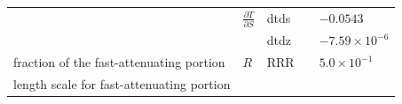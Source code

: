 \begin{longtable}[]{@{}lllll@{}}
\begin{minipage}[t]{0.31\columnwidth}
\end{minipage} & \begin{minipage}[t]{0.19\columnwidth}\raggedright
\(\frac{\partial T}{\partial S}\)\strut
\end{minipage} & \begin{minipage}[t]{0.08\columnwidth}\raggedright
dtds\strut
\end{minipage} & \begin{minipage}[t]{0.12\columnwidth}\raggedright
\strut
\end{minipage} & \begin{minipage}[t]{0.17\columnwidth}\raggedright
\(-0.0543\)\strut
\end{minipage}\tabularnewline
\begin{minipage}[t]{0.31\columnwidth}\raggedright
\strut
\end{minipage} & \begin{minipage}[t]{0.19\columnwidth}\raggedright
\strut
\end{minipage} & \begin{minipage}[t]{0.08\columnwidth}\raggedright
dtdz\strut
\end{minipage} & \begin{minipage}[t]{0.12\columnwidth}\raggedright
\strut
\end{minipage} & \begin{minipage}[t]{0.17\columnwidth}\raggedright
\(-7.59\times 10^{-6}\)\strut
\end{minipage}\tabularnewline
\begin{minipage}[t]{0.31\columnwidth}\raggedright
fraction of the fast-attenuating portion\strut
\end{minipage} & \begin{minipage}[t]{0.19\columnwidth}\raggedright
\(R\)\strut
\end{minipage} & \begin{minipage}[t]{0.08\columnwidth}\raggedright
RRR\strut
\end{minipage} & \begin{minipage}[t]{0.12\columnwidth}\raggedright
\strut
\end{minipage} & \begin{minipage}[t]{0.17\columnwidth}\raggedright
\(5.0\times 10^{-1}\)\strut
\end{minipage}\tabularnewline
\begin{minipage}[t]{0.31\columnwidth}\raggedright
length scale for fast-attenuating portion\strut
\end{minipage} & \begin{minipage}[t]{0.19\columnwidth}\raggedright

\end{minipage}
\end{longtable}
